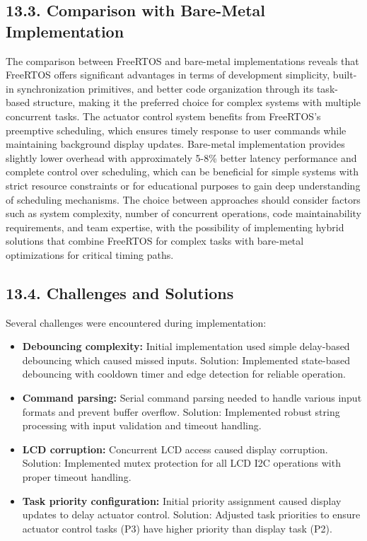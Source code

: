 \documentclass[12pt]{article}
\begin{document}
\subsection*{13.3. Comparison with Bare-Metal Implementation}

The comparison between FreeRTOS and bare-metal implementations reveals that FreeRTOS offers significant advantages in terms of development simplicity, built-in synchronization primitives, and better code organization through its task-based structure, making it the preferred choice for complex systems with multiple concurrent tasks. The actuator control system benefits from FreeRTOS's preemptive scheduling, which ensures timely response to user commands while maintaining background display updates. Bare-metal implementation provides slightly lower overhead with approximately 5-8\% better latency performance and complete control over scheduling, which can be beneficial for simple systems with strict resource constraints or for educational purposes to gain deep understanding of scheduling mechanisms. The choice between approaches should consider factors such as system complexity, number of concurrent operations, code maintainability requirements, and team expertise, with the possibility of implementing hybrid solutions that combine FreeRTOS for complex tasks with bare-metal optimizations for critical timing paths.

\subsection*{13.4. Challenges and Solutions}

Several challenges were encountered during implementation:

\begin{itemize}
    \item \textbf{Debouncing complexity:} Initial implementation used simple delay-based debouncing which caused missed inputs. Solution: Implemented state-based debouncing with cooldown timer and edge detection for reliable operation.
    \item \textbf{Command parsing:} Serial command parsing needed to handle various input formats and prevent buffer overflow. Solution: Implemented robust string processing with input validation and timeout handling.
    \item \textbf{LCD corruption:} Concurrent LCD access caused display corruption. Solution: Implemented mutex protection for all LCD I2C operations with proper timeout handling.
    \item \textbf{Task priority configuration:} Initial priority assignment caused display updates to delay actuator control. Solution: Adjusted task priorities to ensure actuator control tasks (P3) have higher priority than display task (P2).
\end{itemize}
\end{document}
